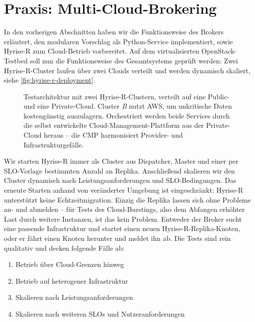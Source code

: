 \section{Praxis: Multi-Cloud-Brokering}
\label{sec:brokering-test}

In den vorherigen Abschnitten haben wir die Funktionsweise des Brokers erläutert, den modularen Vorschlag als Python-Service implementiert, sowie Hyrise-R zum Cloud-Betrieb vorbereitet. Auf dem virtualisierten OpenStack-Testbed soll nun die Funktionsweise des Gesamtsystems geprüft werden: Zwei Hyrise-R-Cluster laufen über zwei Clouds verteilt und werden dynamisch skaliert, siehe \autoref{fig:hyrise-r-deployment}.

\begin{figure}[ht]
	\centering
	\def\svgwidth{0.85\textwidth}
	{\scriptsize \textsf{
			}}
	\caption{Testarchitektur mit zwei Hyrise-R-Clustern, verteilt auf eine Public- und eine Private-Cloud. Cluster \emph{B} nutzt AWS, um unkritische Daten kostengünstig auszulagern. Orchestriert werden beide Services durch die selbst entwickelte Cloud-Management-Plattform aus der Private-Cloud heraus -- die CMP harmonisiert Provider- und Infrastrukturgefälle.}	
	\label{fig:hyrise-r-deployment}
\end{figure}

Wir starten Hyrise-R immer als Cluster aus Dispatcher, Master und einer per SLO-Vorlage bestimmten Anzahl an Replika. Anschließend skalieren wir den Cluster dynamisch nach Leistungsanforderungen und SLO-Bedingungen. Das erneute Starten anhand von veränderter Umgebung ist eingeschränkt: Hyrise-R unterstützt keine Echtzeitmigration. Einzig die Replika lassen sich ohne Probleme an- und abmelden -- für Tests des Cloud-Burstings, also dem Abfangen erhöhter Last durch weitere Instanzen, ist das kein Problem. Entweder der Broker sucht eine passende Infrastruktur und startet einen neuen Hyrise-R-Replika-Knoten, oder er fährt einen Knoten herunter und meldet ihn ab. Die Tests sind rein qualitativ und decken folgende Fälle ab:

\begin{enumerate}
	\item Betrieb über Cloud-Grenzen hinweg
	\item Betrieb auf heterogener Infrastruktur
	\item Skalieren nach Leistungsanforderungen
	\item Skalieren nach weiteren SLOs und Nutzeranforderungen
\end{enumerate}

